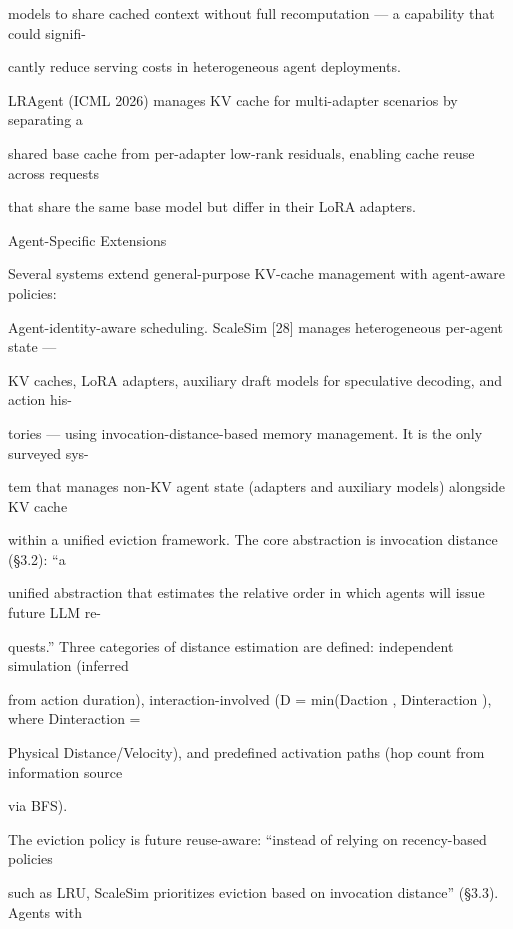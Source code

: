 \begin{flushleft}
\noindent models to share cached context without full recomputation — a capability that could signifi-\par
\noindent cantly reduce serving costs in heterogeneous agent deployments.\par
\noindent  LRAgent (ICML 2026) manages KV cache for multi-adapter scenarios by separating a\par
\noindent shared base cache from per-adapter low-rank residuals, enabling cache reuse across requests\par
\noindent that share the same base model but differ in their LoRA adapters.\par
\par\smallskip
{} Agent-Specific Extensions\par
\noindent Several systems extend general-purpose KV-cache management with agent-aware policies:\par
\par\smallskip
\noindent Agent-identity-aware scheduling. ScaleSim [28] manages heterogeneous per-agent state —\par
\noindent KV caches, LoRA adapters, auxiliary draft models for speculative decoding, and action his-\par
\noindent tories — using invocation-distance-based memory management. It is the only surveyed sys-\par
\noindent tem that manages non-KV agent state (adapters and auxiliary models) alongside KV cache\par
\noindent within a unified eviction framework. The core abstraction is invocation distance (§3.2): “a\par
\noindent unified abstraction that estimates the relative order in which agents will issue future LLM re-\par
\noindent quests.” Three categories of distance estimation are defined: independent simulation (inferred\par
\noindent from action duration), interaction-involved (D = min(Daction , Dinteraction ), where Dinteraction =\par
\noindent Physical Distance/Velocity), and predefined activation paths (hop count from information source\par
\noindent via BFS).\par
\noindent  The eviction policy is future reuse-aware: “instead of relying on recency-based policies\par
\noindent such as LRU, ScaleSim prioritizes eviction based on invocation distance” (§3.3). Agents with\par

\end{flushleft}
